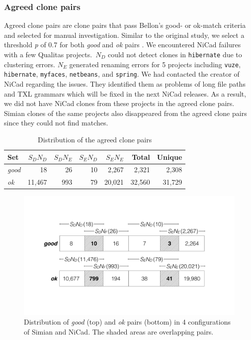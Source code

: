 \documentclass[sigconf,review, anonymous]{acmart}
\begin{document}
\subsubsection{Agreed clone pairs}

Agreed clone pairs are clone pairs that pass Bellon's good- or ok-match criteria and selected for manual investigation. Similar to the original study, we select a threshold \textit{p} of 0.7 for both \textit{good} and \textit{ok} pairs \cite{Bellon2007}. %
We encountered NiCad failures with a few Qualitas projects.~$N_D$ could not detect clones in \texttt{hibernate} due to clustering errors. $N_E$ generated renaming errors for 5 projects including \texttt{vuze}, \texttt{hibernate}, \texttt{myfaces}, \texttt{netbeans}, and \texttt{spring}. We had contacted the creator of NiCad regarding the issues. They identified them as problems of long file paths and TXL grammars which will be fixed in the next NiCad releases. As a result, we did not have NiCad clones from these projects in the agreed clone pairs. Simian clones of the same projects also disappeared from the agreed clone pairs since they could not find matches.

\begin{table}
	\centering
	\caption{Distribution of the agreed clone pairs}
	\label{t_agreed_good_clone_pairs}
	\small
	\begin{tabular}{l|r|r|r|r|r|r}
		\hline
		Set & $S_DN_D$ & $S_DN_E$ & $S_EN_D$ & $S_EN_E$ & Total & Unique \\
		\hline
		\textit{good} & 18 & 26 & 10 & 2,267 & 2,321 & 2,308 \\
		\textit{ok} & 11,467 & 993 & 79 & 20,021 & 32,560 & 31,729  \\
		\hline
	\end{tabular} %
\end{table}

\begin{figure}
	\centering
	\includegraphics[width=\linewidth]{good-ok_pairs-crop}
	\caption{Distribution of \textit{good} (top) and \textit{ok} pairs (bottom) in 4 configurations of Simian and NiCad. The shaded areas are overlapping pairs.}
	\label{fig:good-ok-pairs}
\end{figure}
\end{document}
